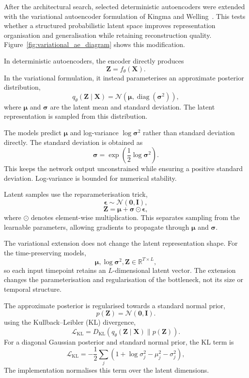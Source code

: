 After the architectural search, selected deterministic autoencoders were
extended with the variational autoencoder formulation of Kingma and
Welling~\cite{KingmaWelling2014}. This tests whether a structured
probabilistic latent space improves representation organisation and
generalisation while retaining reconstruction quality. Figure~\ref{fig:variational_ae_diagram}
shows this modification.

In deterministic autoencoders, the encoder directly produces
\[
\mathbf{Z}=f_{\theta}(\mathbf{X}).
\]
In the variational formulation, it instead parameterises an approximate
posterior distribution,
\[
q_{\theta}(\mathbf{Z}\mid\mathbf{X})
=
\mathcal{N}
\left(
\boldsymbol{\mu},
\operatorname{diag}(\boldsymbol{\sigma}^{2})
\right),
\]
where $\boldsymbol{\mu}$ and $\boldsymbol{\sigma}$ are the latent mean
and standard deviation. The latent representation is sampled from this
distribution.

The models predict $\boldsymbol{\mu}$ and log-variance
$\log\boldsymbol{\sigma}^{2}$ rather than standard deviation directly.
The standard deviation is obtained as
\[
\boldsymbol{\sigma}
=
\exp\left(
\frac{1}{2}\log\boldsymbol{\sigma}^{2}
\right).
\]
This keeps the network output unconstrained while ensuring a positive
standard deviation. Log-variance is bounded for numerical stability.

Latent samples use the reparameterisation trick,
\[
\boldsymbol{\epsilon}
\sim
\mathcal{N}(\mathbf{0},\mathbf{I}),
\]
\[
\mathbf{Z}
=
\boldsymbol{\mu}
+
\boldsymbol{\sigma}\odot\boldsymbol{\epsilon},
\]
where $\odot$ denotes element-wise multiplication. This separates
sampling from the learnable parameters, allowing gradients to propagate
through $\boldsymbol{\mu}$ and $\boldsymbol{\sigma}$.

The variational extension does not change the latent representation
shape. For the time-preserving models,
\[
\boldsymbol{\mu},
\log\boldsymbol{\sigma}^{2},
\mathbf{Z}
\in
\mathbb{R}^{T\times L},
\]
so each input timepoint retains an $L$-dimensional latent vector. The
extension changes the parameterisation and regularisation of the
bottleneck, not its size or temporal structure.

The approximate posterior is regularised towards a standard normal
prior,
\[
p(\mathbf{Z})
=
\mathcal{N}(\mathbf{0},\mathbf{I}).
\]
using the Kullback--Leibler (KL) divergence,
\[
\mathcal{L}_{\mathrm{KL}}
=
D_{\mathrm{KL}}
\left(
q_{\theta}(\mathbf{Z}\mid\mathbf{X})
\parallel
p(\mathbf{Z})
\right).
\]
For a diagonal Gaussian posterior and standard normal prior, the KL term
is
\[
\mathcal{L}_{\mathrm{KL}}
=
-\frac{1}{2}
\sum_j
\left(
1+\log\sigma_j^2-\mu_j^2-\sigma_j^2
\right),
\]
The implementation normalises this term over the latent dimensions.

